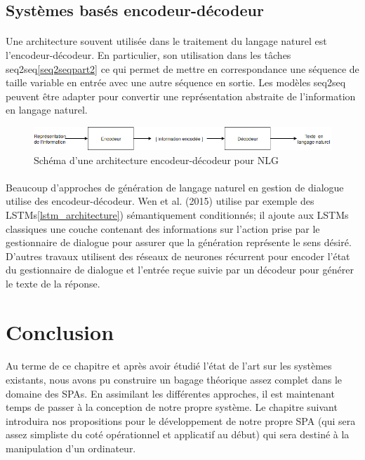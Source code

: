 \subsection{Systèmes basés encodeur-décodeur}
\paragraph{}
Une architecture souvent utilisée dans le traitement du langage naturel est l’encodeur-décodeur. En particulier, son utilisation dans les tâches seq2seq\ref{seq2seqpart2} ce qui permet de mettre en correspondance une séquence de taille variable en entrée avec une autre séquence en sortie. Les modèles seq2seq peuvent être adapter pour convertir une représentation abstraite de l’information en langage naturel\cite{Ferreira2017}.\newline
\begin{figure}[H]
	\centering
	\includegraphics[width=.95\linewidth]{images/NLG/Encoder.png} 
	\caption{Schéma d'une architecture encodeur-décodeur pour NLG} 
\end{figure}
\paragraph{}
Beaucoup d’approches de génération de langage naturel en gestion de dialogue utilise des encodeur-décodeur. Wen et al. (2015)\cite{Wen2015} utilise par exemple des LSTMs\ref{lstm_architecture}) sémantiquement conditionnés; il ajoute aux LSTMs classiques une couche contenant des informations sur l’action prise par le gestionnaire de dialogue pour assurer que la génération représente le sens désiré. D’autres travaux utilisent des réseaux de neurones récurrent pour encoder l’état du gestionnaire de dialogue et l’entrée reçue suivie par un décodeur pour générer le texte de la réponse\cite{Sordoni2015,Serban2016,Goyal2016}.
\newpage
\section{Conclusion}
\paragraph{}
Au terme de ce chapitre et après avoir étudié l'état de l'art sur les systèmes existants, nous avons pu construire un bagage théorique assez complet dans le domaine des SPAs. En assimilant les différentes approches, il est maintenant temps de passer à la conception de notre propre système. Le chapitre suivant introduira nos propositions pour le développement de notre propre SPA (qui sera assez simpliste du coté opérationnel et applicatif au début) qui sera destiné à la manipulation d'un ordinateur.